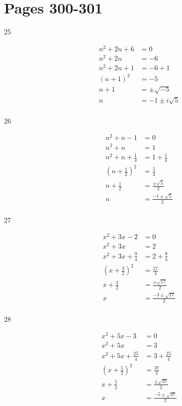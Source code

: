 \documentclass[fleqn,addpoints]{exam}
\begin{document}
\ifprintanswers

\section{Pages 300-301}
\begin{description}

\item[25] 
\begin{align*}
  n^2 + 2n + 6 &= 0 \\
  n^2 + 2n &= -6 \\
  n^2 + 2n + 1 &= -6 + 1 \\
  (n+1)^2 &= -5 \\
  n+1 &= \pm \sqrt{-5} \\
  n &= - 1 \pm i\sqrt{5} \\
\end{align*}

\item[26] 
\begin{align*}
  n^2 + n - 1 &= 0 \\
  n^2 + n  &= 1 \\
  n^2 + n  + \frac{1}{4} &= 1 + \frac{1}{4} \\
  \left( n + \frac{1}{2} \right)^2 &= \frac{5}{4} \\
  n + \frac{1}{2} &= \frac{\pm \sqrt{5}}{2} \\
  n &= \frac{-1 \pm \sqrt{5}}{2} \\
\end{align*}

\item[27] 
\begin{align*}
  x^2 + 3x - 2 &= 0 \\
  x^2 + 3x &= 2 \\  
  x^2 + 3x + \frac{9}{4} &= 2 + \frac{9}{4} \\  
  \left( x + \frac{3}{2} \right)^2 &= \frac{17}{4} \\
  x + \frac{3}{2} &= \frac{\pm \sqrt{17}}{2} \\
  x &= \frac{-3 \pm \sqrt{17}}{2} \\
\end{align*}

\item[28] 
\begin{align*}
  x^2 + 5x - 3 &= 0 \\
  x^2 + 5x &= 3 \\
  x^2 + 5x + \frac{25}{4} &= 3 + \frac{25}{4} \\
  \left( x + \frac{5}{2} \right)^2 &= \frac{37}{4} \\
  x + \frac{5}{2} &= \frac{\pm \sqrt{37}}{2} \\
 x &= \frac{-5 \pm \sqrt{37}}{2} \\
\end{align*}


\end{description}
\end{document}
